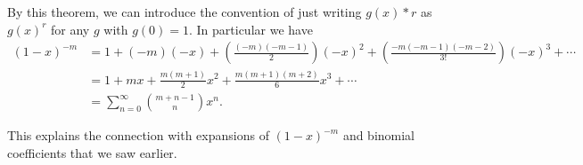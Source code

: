 By this theorem, we can introduce the convention of just writing $g(x)*r$ as $g(x)^r$ for any $g$ with $g(0) = 1$. In particular we have
\begin{align*}
(1 - x)^{-m} &= 1 + (-m)(-x) + \left(\frac{(-m)(-m - 1)}{2}\right)(-x)^2 + \left(\frac{-m(-m-1)(-m -2)}{3!}\right)(-x)^3  + \cdots \\
&= 1 + mx + \frac{m(m+1)}{2}x^2 + \frac{m(m + 1)(m + 2)}{6}x^3 + \cdots \\
&= \sum_{n = 0}^{\infty}\binom{m + n - 1}{n}x^n.
\end{align*}

This explains the connection with expansions of $(1 - x)^{-m}$ and binomial coefficients that we saw earlier.


